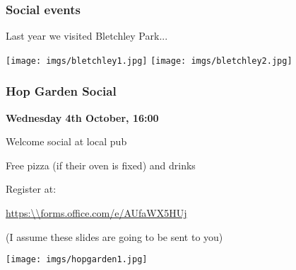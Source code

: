 \begin{frame}
    \frametitle{Social events}
    \centering

    \Large
    Last year we visited Bletchley Park...

    \vspace{1em}

    \texttt{[image: imgs/bletchley1.jpg]}
    \texttt{[image: imgs/bletchley2.jpg]}

\end{frame}
\begin{frame}
    \frametitle{Hop Garden Social}
    \centering

    \textbf{\LARGE Wednesday 4th October, 16:00}

    \vspace{1em}

    \begin{minipage}{0.4\textwidth}

        Welcome social at local pub

        Free \alert{pizza}
        {\scriptsize(if their oven is fixed)}
        and \alert{drinks}

        \vspace{1em}

        Register at:

        \url{https:\\forms.office.com/e/AUfaWX5HUj}

        \vspace{1em}

        \scriptsize
        (I assume these slides are going to be sent to you)

    \end{minipage}
    \qquad
    \begin{minipage}{0.4\textwidth}
        \texttt{[image: imgs/hopgarden1.jpg]}
    \end{minipage}
\end{frame}
